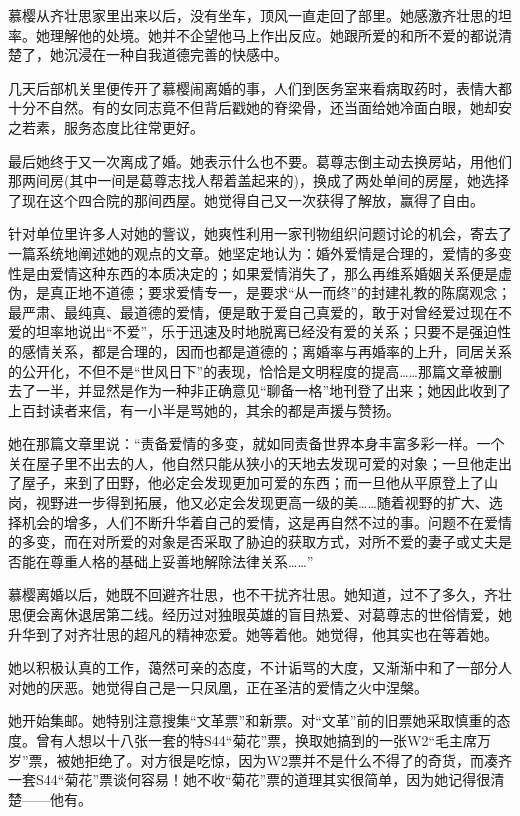 \par 慕樱从齐壮思家里出来以后，没有坐车，顶风一直走回了部里。她感激齐壮思的坦率。她理解他的处境。她并不企望他马上作出反应。她跟所爱的和所不爱的都说清楚了，她沉浸在一种自我道德完善的快感中。
\par 几天后部机关里便传开了慕樱闹离婚的事，人们到医务室来看病取药时，表情大都十分不自然。有的女同志竟不但背后戳她的脊梁骨，还当面给她冷面白眼，她却安之若素，服务态度比往常更好。
\par 最后她终于又一次离成了婚。她表示什么也不要。葛尊志倒主动去换房站，用他们那两间房(其中一间是葛尊志找人帮着盖起来的)，换成了两处单间的房屋，她选择了现在这个四合院的那间西屋。她觉得自己又一次获得了解放，赢得了自由。
\par 针对单位里许多人对她的訾议，她爽性利用一家刊物组织问题讨论的机会，寄去了一篇系统地阐述她的观点的文章。她坚定地认为：婚外爱情是合理的，爱情的多变性是由爱情这种东西的本质决定的；如果爱情消失了，那么再维系婚姻关系便是虚伪，是真正地不道德；要求爱情专一，是要求“从一而终”的封建礼教的陈腐观念；最严肃、最纯真、最道德的爱情，便是敢于爱自己真爱的，敢于对曾经爱过现在不爱的坦率地说出“不爱”，乐于迅速及时地脱离已经没有爱的关系；只要不是强迫性的感情关系，都是合理的，因而也都是道德的；离婚率与再婚率的上升，同居关系的公开化，不但不是“世风日下”的表现，恰恰是文明程度的提高……那篇文章被删去了一半，并显然是作为一种非正确意见“聊备一格”地刊登了出来；她因此收到了上百封读者来信，有一小半是骂她的，其余的都是声援与赞扬。
\par 她在那篇文章里说：“责备爱情的多变，就如同责备世界本身丰富多彩一样。一个关在屋子里不出去的人，他自然只能从狭小的天地去发现可爱的对象；一旦他走出了屋子，来到了田野，他必定会发现更加可爱的东西；而一旦他从平原登上了山岗，视野进一步得到拓展，他又必定会发现更高一级的美……随着视野的扩大、选择机会的增多，人们不断升华着自己的爱情，这是再自然不过的事。问题不在爱情的多变，而在对所爱的对象是否采取了胁迫的获取方式，对所不爱的妻子或丈夫是否能在尊重人格的基础上妥善地解除法律关系……”
\par 慕樱离婚以后，她既不回避齐壮思，也不干扰齐壮思。她知道，过不了多久，齐壮思便会离休退居第二线。经历过对独眼英雄的盲目热爱、对葛尊志的世俗情爱，她升华到了对齐壮思的超凡的精神恋爱。她等着他。她觉得，他其实也在等着她。
\par 她以积极认真的工作，蔼然可亲的态度，不计诟骂的大度，又渐渐中和了一部分人对她的厌恶。她觉得自己是一只凤凰，正在圣洁的爱情之火中涅槃。
\par 她开始集邮。她特别注意搜集“文革票”和新票。对“文革”前的旧票她采取慎重的态度。曾有人想以十八张一套的特S44“菊花”票，换取她搞到的一张W2“毛主席万岁”票，被她拒绝了。对方很是吃惊，因为W2票并不是什么不得了的奇货，而凑齐一套S44“菊花”票谈何容易！她不收“菊花”票的道理其实很简单，因为她记得很清楚——他有。
